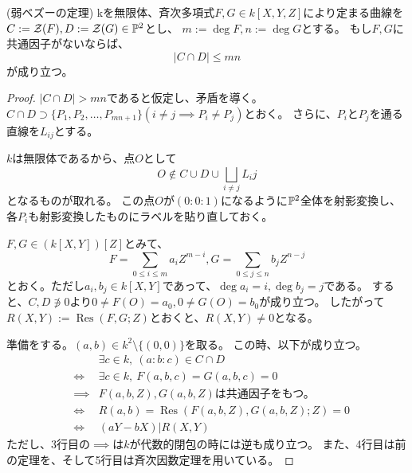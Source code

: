 \documentclass[a4paper]{jsarticle}
\newcommand{\Res}{\operatorname{Res}}
\begin{document}
    \begin{Prop}(弱ベズーの定理)
        kを無限体、斉次多項式$F,G \in k[X,Y,Z]$により定まる曲線を
        $C:=\mathcal{Z}(F), D:=\mathcal{Z}(G) \in \mathbb{P}^2$とし、
        $m:=\deg F, n:=\deg G$とする。
        もし$F,G$に共通因子がないならば、
        \[ |C \cap D| \leq mn \]
        が成り立つ。
    \end{Prop}
    \begin{proof}
        $|C \cap D|>mn$であると仮定し、矛盾を導く。
        $C \cap D \supset \{ P_1, P_2, \dots, P_{mn+1} \}(i \neq j \implies P_i \neq P_j)$とおく。
        さらに、$P_i$と$P_j$を通る直線を$L_{ij}$とする。

        $k$は無限体であるから、点$O$として
        \[ O \not \in C \cup D \cup \bigsqcup_{i \neq j}{L_ij} \]
        となるものが取れる。
        この点$O$が$(0:0:1)$になるように$\mathbb{P}^2$全体を射影変換し、
        各$P_i$も射影変換したものにラベルを貼り直しておく。

        $F,G \in (k[X, Y])[Z]$とみて、
        \[ F=\sum_{0 \leq i \leq m}{a_{i} Z^{m-i}}, G=\sum_{0 \leq j \leq n}{b_{j} Z^{n-j}} \]
        とおく。ただし$a_i, b_j \in k[X, Y]$であって、$\deg a_i=i, \deg b_j=j$である。
        すると、$C,D \not \ni 0$より$0 \neq F(O)=a_0, 0 \neq G(O)=b_0$が成り立つ。
        したがって$R(X, Y):=\Res(F,G; Z)$とおくと、$R(X,Y) \neq 0$となる。

        準備をする。$(a,b) \in k^2 \setminus \{ (0,0) \}$を取る。
        この時、以下が成り立つ。
        \begin{eqnarray*}
            &{}& \exists c \in k,~ (a:b:c) \in C \cap D \\
            &\iff& \exists c \in k,~ F(a,b,c)=G(a,b,c)=0 \\
            &\implies& F(a,b,Z), G(a,b,Z)\mbox{は共通因子をもつ。} \\
            &\iff& R(a,b)=\Res ( F(a,b,Z), G(a,b,Z); Z )=0 \\
            &\iff& (aY-bX) | R(X,Y)
        \end{eqnarray*}
        ただし、3行目の$\implies$は$k$が代数的閉包の時には逆も成り立つ。
        また、4行目は前の定理を、そして5行目は斉次因数定理を用いている。
        

\end{proof}
\end{document}
